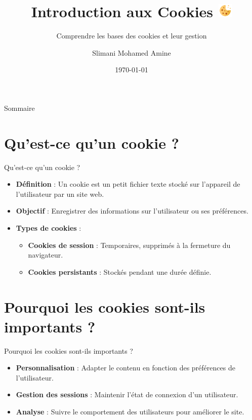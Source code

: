 \documentclass{clbeamer2024}
\title{
        Introduction aux Cookies
	\includegraphics[width=0.7cm]{logos/cookie.png} \hfill
}
\subtitle{Comprendre les bases des cookies et leur gestion}
\author{Slimani Mohamed Amine}
\institute{EHTP}
\date{\today}
\begin{document}
	\setcounter{framenumber}{-1}
	\frame{\titlepage}
	
	
	
	\begin{frame}{Sommaire}
		\tableofcontents
	\end{frame}
	
	
	\section{Qu'est-ce qu'un cookie ?}
	\begin{frame}{Qu'est-ce qu'un cookie ?}
		\begin{itemize}
			\item \textbf{Définition} : Un cookie est un petit fichier texte stocké sur l'appareil de l'utilisateur par un site web.
			\item \textbf{Objectif} : Enregistrer des informations sur l'utilisateur ou ses préférences.
			\item \textbf{Types de cookies} :
			\begin{itemize}
				\item \textbf{Cookies de session} : Temporaires, supprimés à la fermeture du navigateur.
				\item \textbf{Cookies persistants} : Stockés pendant une durée définie.
			\end{itemize}
		\end{itemize}
	\end{frame}
	
	
	\section{Pourquoi les cookies sont-ils importants ?}
	\begin{frame}{Pourquoi les cookies sont-ils importants ?}
		\begin{itemize}
			\item \textbf{Personnalisation} : Adapter le contenu en fonction des préférences de l'utilisateur.
			\item \textbf{Gestion des sessions} : Maintenir l'état de connexion d'un utilisateur.
			\item \textbf{Analyse} : Suivre le comportement des utilisateurs pour améliorer le site.
		\end{itemize}
	\end{frame}
	
	
\end{document}

